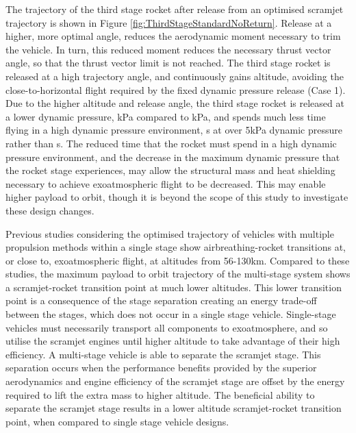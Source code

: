 The trajectory of the third stage rocket after release from an optimised scramjet trajectory is shown in Figure \ref{fig:ThirdStageStandardNoReturn}. Release at a higher, more optimal angle, reduces the aerodynamic moment necessary to trim the vehicle. In turn, this reduced moment reduces the necessary thrust vector angle, so that the thrust vector limit is not reached. The third stage rocket is released at a high trajectory angle, and continuously gains altitude, avoiding the close-to-horizontal flight required by the fixed dynamic pressure release (Case 1).
Due to the higher altitude and release angle, the third stage rocket is released at a lower dynamic pressure, \secondthirdSeparationqCdStandardNoReturn kPa compared to \secondthirdSeparationqConstqNoReturn kPa, and spends much less time flying in a high dynamic pressure environment, \thirdqOverFiveStandard s at over 5kPa dynamic pressure rather than \thirdqOverFiveConstqNoReturn s. 
The reduced time that the rocket must spend in a high dynamic pressure environment, and the decrease in the maximum dynamic pressure that the rocket stage experiences, may allow the structural mass and heat shielding necessary to achieve exoatmospheric flight to be decreased. This may enable higher payload to orbit, though it is beyond the scope of this study to investigate these design changes. 


Previous studies considering the optimised trajectory of vehicles with multiple propulsion methods within a single stage show airbreathing-rocket transitions at, or close to, exoatmospheric flight, at altitudes from 56-130km\cite{Lu1993,Trefny1999,Bradford2000}. Compared to these studies, the maximum payload to orbit trajectory of the multi-stage system shows a scramjet-rocket transition point at much lower altitudes.
This lower transition point is a consequence of the stage separation creating an energy trade-off between the stages, which does not occur in a single stage vehicle. Single-stage vehicles must necessarily transport all components to exoatmosphere, and so utilise the scramjet engines until higher altitude to take advantage of their high efficiency. A multi-stage vehicle is able to separate the scramjet stage. 
This separation occurs when the performance benefits provided by the superior aerodynamics and engine efficiency of the scramjet stage are offset by the energy required to lift the extra mass to higher altitude. The beneficial ability
to separate the scramjet stage results in a lower altitude scramjet-rocket transition point, when compared to single
stage vehicle designs.



